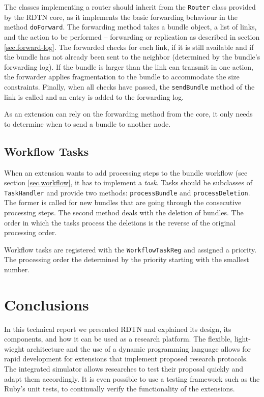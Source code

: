 \documentclass{article}
\begin{document}
The classes implementing a router should inherit from the {\tt Router} class
provided by the RDTN core, as it implements the basic forwarding behaviour in
the method {\tt doForward}. The forwarding method takes a bundle object, a list
of links, and the action to be performed -- forwarding or replication as
described in section \ref{sec.forward-log}. The forwarded checks for each link,
if it is still available and if the bundle has not already been sent to the
neighbor (determined by the bundle's forwarding log). If the bundle is larger
than the link can transmit in one action, the forwarder applies fragmentation to
the bundle to accommodate the size constraints. Finally, when all checks have
passed, the {\tt sendBundle} method of the link is called and an entry is added
to the forwarding log.

As an extension can rely on the forwarding method from the core, it only needs
to determine when to send a bundle to another node.

\subsection{Workflow Tasks}\label{sec.ext.workflow}

When an extension wants to add processing steps to the bundle workflow (see
section \ref{sec.workflow}, it has to implement a {\em task}. Tasks should be
subclasses of {\tt TaskHandler} and provide two methods: {\tt processBundle} and
{\tt processDeletion}. The former is called for new bundles that are going
through the consecutive processing steps. The second method deals with the
deletion of bundles. The order in which the tasks process the deletions is
the reverse of the original processing order.

Workflow tasks are registered with the {\tt WorkflowTaskReg} and assigned a
priority. The processing order the determined by the priority starting with the
smallest number.

\section{Conclusions}\label{sec.conclusions}

In this technical report we presented RDTN and explained its design, its
components, and how it can be used as a research platform. The flexible,
light-wieght architecture and the use of a dynamic programming language allows
for rapid development for extensions that implement proposed research protocols.
The integrated simulator allows researches to test their proposal quickly and
adapt them accordingly. It is even possible to use a testing framework such as
the Ruby's unit tests, to continually verify the functionality of the
extensions.
\end{document}
